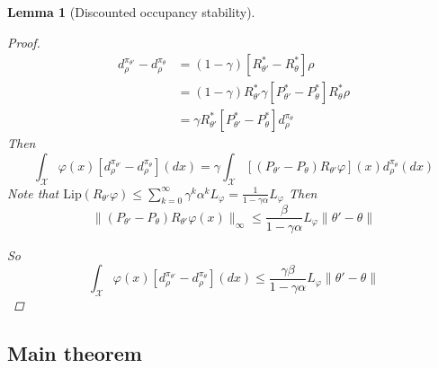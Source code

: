 \documentclass{article}
\newtheorem{lem}[thm]{Lemma}
\theoremstyle{definition}
\theoremstyle{remark}
\theoremstyle{mystyle}
\newcommand{\1}{\mathbbm{1}}
\begin{document}
\begin{lem}[Discounted occupancy stability]
\begin{proof}
\begin{align*}
    d^{\pi_{\theta'}}_\rho-d^{\pi_\theta}_\rho&=(1-\gamma)[R_{\theta'}^*-R^*_\theta]\rho\\
    &=(1-\gamma)R_{\theta'}^*\gamma[P^*_{\theta'}-P^*_\theta]R_\theta^*\rho\\
    &=\gamma R^*_{\theta'}[P^*_{\theta'}-P^*_\theta]d^{\pi_\theta}_\rho
\end{align*}
Then 
\[\int_\mathcal{X}\varphi(x)[d^{\pi_{\theta'}}_\rho-d^{\pi_\theta}_\rho](dx)=\gamma\int_\mathcal{X}[(P_{\theta'}-P_\theta)R_{\theta'}\varphi](x)d^{\pi_\theta}_\rho(dx)
\]
Note that $\text{Lip}(R_{\theta'}\varphi)\leq \sum^\infty_{k=0}\gamma^k\alpha^kL_{\varphi}=\frac{1}{1-\gamma \alpha}L_\varphi$
Then
\[
\|(P_{\theta'}-P_\theta)R_{\theta'}\varphi (x)\|_\infty\leq \frac{\beta}{1-\gamma \alpha}L_\varphi \|\theta'-\theta\|
\]

So
\[
\int_\mathcal{X}\varphi(x)[d^{\pi_{\theta'}}_\rho-d^{\pi_\theta}_\rho](dx)\leq  \frac{\gamma\beta}{1-\gamma \alpha}L_\varphi \|\theta'-\theta\|
\]


\end{proof}
\end{lem}

\subsection{Main theorem}
\end{document}
